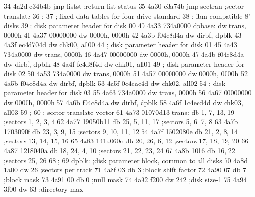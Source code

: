  34      4a2d c34b4b               jmp    listst         ;return list status
 35      4a30 c3a74b               jmp    sectran        ;sector translate
 36                       ;
 37                       ;        fixed data tables for four-drive standard
 38                       ;        ibm-compatible 8" disks
 39                       ;        disk parameter header for disk 00
 40      4a33 734a0000    dpbase:  dw     trans, 0000h
 41      4a37 00000000             dw     0000h, 0000h
 42      4a3b f04c8d4a             dw     dirbf, dpblk
 43      4a3f ec4d704d             dw     chk00, all00
 44                       ;        disk parameter header for disk 01
 45      4a43 734a0000             dw     trans, 0000h
 46      4a47 00000000             dw     0000h, 0000h
 47      4a4b f04c8d4a             dw     dirbf, dpblk
 48      4a4f fc4d8f4d             dw     chk01, all01
 49                       ;        disk parameter header for disk 02
 50      4a53 734a0000             dw     trans, 0000h
 51      4a57 00000000             dw     0000h, 0000h
 52      4a5b f04c8d4a             dw     dirbf, dpblk
 53      4a5f 0c4eae4d             dw     chk02, all02
 54                       ;        disk parameter header for disk 03
 55      4a63 734a0000             dw     trans, 0000h
 56      4a67 00000000             dw     0000h, 0000h
 57      4a6b f04c8d4a             dw     dirbf, dpblk
 58      4a6f 1c4ecd4d             dw     chk03, all03
 59                       ;
 60                       ;        sector translate vector
 61      4a73 01070d13    trans:   db     1, 7, 13, 19   ;sectors 1, 2, 3, 4
 62      4a77 19050b11             db     25, 5, 11, 17  ;sectors 5, 6, 7, 8
 63      4a7b 1703090f             db     23, 3, 9, 15   ;sectors 9, 10, 11, 12
 64      4a7f 1502080e             db     21, 2, 8, 14   ;sectors 13, 14, 15, 16
 65      4a83 141a060c             db     20, 26, 6, 12  ;sectors 17, 18, 19, 20
 66      4a87 1218040a             db     18, 24, 4, 10  ;sectors 21, 22, 23, 24
 67      4a8b 1016                 db     16, 22         ;sectors 25, 26
 68                       ;
 69                       dpblk:   ;disk parameter block, common to all disks
 70      4a8d 1a00                 dw     26             ;sectors per track
 71      4a8f 03                   db     3              ;block shift factor
 72      4a90 07                   db     7              ;block mask
 73      4a91 00                   db     0              ;null mask
 74      4a92 f200                 dw     242            ;disk size-1
 75      4a94 3f00                 dw     63             ;directory max

